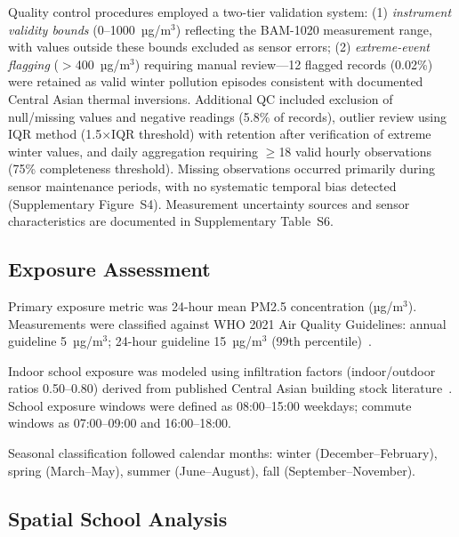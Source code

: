 \documentclass[11pt,a4paper]{article}
\begin{document}
Quality control procedures employed a two-tier validation system: (1) \textit{instrument validity bounds} (0--1000~µg/m$^3$) reflecting the BAM-1020 measurement range, with values outside these bounds excluded as sensor errors; (2) \textit{extreme-event flagging} ($>$400~µg/m$^3$) requiring manual review---12 flagged records (0.02\%) were retained as valid winter pollution episodes consistent with documented Central Asian thermal inversions. Additional QC included exclusion of null/missing values and negative readings (5.8\% of records), outlier review using IQR method (1.5$\times$IQR threshold) with retention after verification of extreme winter values, and daily aggregation requiring $\geq$18 valid hourly observations (75\% completeness threshold). Missing observations occurred primarily during sensor maintenance periods, with no systematic temporal bias detected (Supplementary Figure~S4). Measurement uncertainty sources and sensor characteristics are documented in Supplementary Table~S6.

\subsection{Exposure Assessment}

Primary exposure metric was 24-hour mean PM2.5 concentration (µg/m$^3$). Measurements were classified against WHO 2021 Air Quality Guidelines: annual guideline 5~µg/m$^3$; 24-hour guideline 15~µg/m$^3$ (99th percentile)~\cite{who2021guidelines}.

Indoor school exposure was modeled using infiltration factors (indoor/outdoor ratios 0.50--0.80) derived from published Central Asian building stock literature~\cite{abt2000relative,macintosh2009residential,chen2012review}. School exposure windows were defined as 08:00--15:00 weekdays; commute windows as 07:00--09:00 and 16:00--18:00.

Seasonal classification followed calendar months: winter (December--February), spring (March--May), summer (June--August), fall (September--November).

\subsection{Spatial School Analysis}
\end{document}
